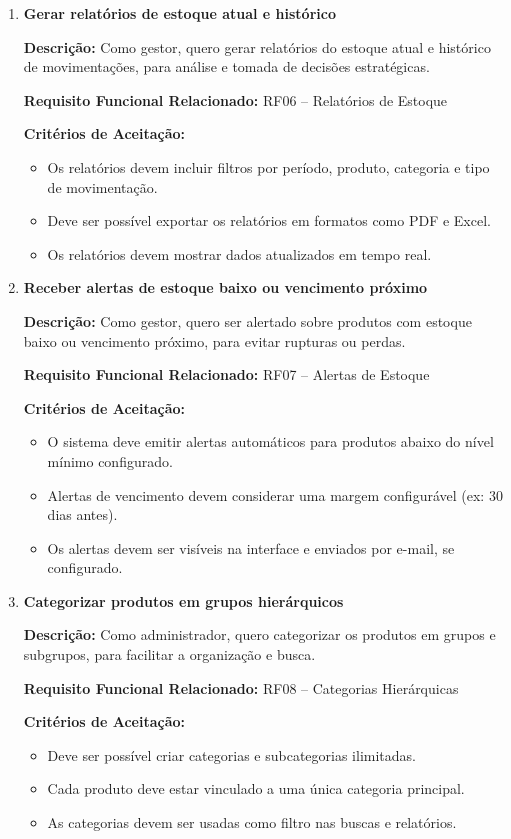 \documentclass[
	12pt,				%
	openright,			%
	twoside,			%
	a4paper,			%
	english,			%
	french,				%
	spanish,			%
	brazil				%
	]{abntex2}
\begin{document}
\begin{enumerate}
\item \textbf{Gerar relatórios de estoque atual e histórico}

\textbf{Descrição:} Como gestor, quero gerar relatórios do estoque atual e histórico de movimentações, para análise e tomada de decisões estratégicas.

\textbf{Requisito Funcional Relacionado:} RF06 -- Relatórios de Estoque

\textbf{Critérios de Aceitação:}
\begin{itemize}
  \item Os relatórios devem incluir filtros por período, produto, categoria e tipo de movimentação.
  \item Deve ser possível exportar os relatórios em formatos como PDF e Excel.
  \item Os relatórios devem mostrar dados atualizados em tempo real.
\end{itemize}

\item \textbf{Receber alertas de estoque baixo ou vencimento próximo}

\textbf{Descrição:} Como gestor, quero ser alertado sobre produtos com estoque baixo ou vencimento próximo, para evitar rupturas ou perdas.

\textbf{Requisito Funcional Relacionado:} RF07 -- Alertas de Estoque

\textbf{Critérios de Aceitação:}
\begin{itemize}
  \item O sistema deve emitir alertas automáticos para produtos abaixo do nível mínimo configurado.
  \item Alertas de vencimento devem considerar uma margem configurável (ex: 30 dias antes).
  \item Os alertas devem ser visíveis na interface e enviados por e-mail, se configurado.
\end{itemize}

\item \textbf{Categorizar produtos em grupos hierárquicos}

\textbf{Descrição:} Como administrador, quero categorizar os produtos em grupos e subgrupos, para facilitar a organização e busca.

\textbf{Requisito Funcional Relacionado:} RF08 -- Categorias Hierárquicas

\textbf{Critérios de Aceitação:}
\begin{itemize}
  \item Deve ser possível criar categorias e subcategorias ilimitadas.
  \item Cada produto deve estar vinculado a uma única categoria principal.
  \item As categorias devem ser usadas como filtro nas buscas e relatórios.
\end{itemize}


\end{enumerate}
\end{document}
